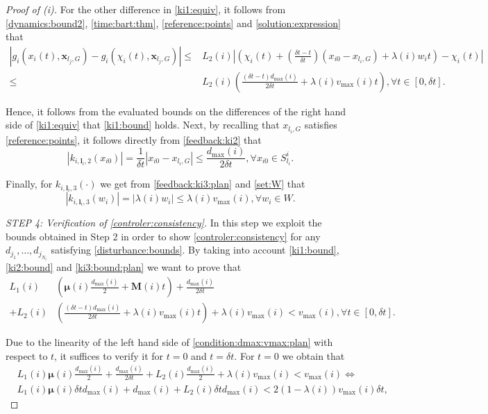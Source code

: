 \documentclass[reqno]{amsart}
\theoremstyle{plain}
\theoremstyle{definition}
\numberwithin{equation}{section}
\begin{document}
\begin{proof}[Proof of (i)]
\noindent For the other difference in \eqref{ki1:equiv}, it follows from \eqref{dynamics:bound2}, \eqref{time:bart:thm}, \eqref{reference:points} and \eqref{solution:expression} that
\begin{align*}
|g_i(x_i(t),{\textbf{{x}}}_{l_j,G})-g_i(\chi_i(t),{\textbf{{x}}}_{l_j,G})| \le & L_2(i)\left|\left(\chi_i(t)+\left(\frac{\delta t-t}{\delta t}\right)(x_{i0}-x_{l_i,G})+\lambda(i) w_it\right)-\chi_i(t)\right| \\
\le & L_{2}(i)\left(\frac{(\delta t-t)d_{\max}(i)}{2\delta t}+\lambda(i)v_{\max}(i)t\right), \forall t\in[0,\delta t].
\end{align*}

\noindent Hence, it follows from the evaluated bounds on the differences of the right hand side of \eqref{ki1:equiv} that \eqref{ki1:bound} holds. Next, by recalling that $x_{l_i,G}$ satisfies \eqref{reference:points}, it follows directly from \eqref{feedback:ki2} that
\begin{equation} \label{ki2:bound}
|k_{i,{\textbf{{l}}}_i,2}(x_{i0})|=\frac{1}{\delta t}|x_{i0}-x_{l_i,G}|\le \frac{d_{\max}(i)}{2\delta t},\forall x_{i0}\in S_{l_i}^i.
\end{equation}

\noindent Finally, for $k_{i,{\textbf{{l}}}_i,3}(\cdot)$ we get from \eqref{feedback:ki3:plan} and \eqref{set:W} that
\begin{equation} \label{ki3:bound:plan}
|k_{i,{\textbf{{l}}}_i,3}(w_i)| = |\lambda(i) w_i|\le \lambda(i) v_{\max}(i),\forall w_i\in W.
\end{equation}

\noindent \textit{STEP 4: Verification of \eqref{controler:consistency}.} In this step we exploit the bounds obtained in Step 2 in order to show \eqref{controler:consistency} for any $d_{j_1},\ldots,d_{j_{N_i}}$ satisfying \eqref{disturbance:bounds}. By taking into account \eqref{ki1:bound}, \eqref{ki2:bound} and \eqref{ki3:bound:plan} we want to prove that
\begin{align}
 L_{1}(i) & \left({\ensuremath{\boldsymbol{{\mu}}}}(i)\frac{d_{\max}(i)}{2}+{\textbf{{M}}}(i)t\right)+\frac{d_{\max}(i)}{2\delta t} \nonumber \\
 +L_{2}(i) &\left(\frac{(\delta t-t)d_{\max}(i)}{2\delta t}+\lambda(i)v_{\max}(i)t\right)+\lambda(i) v_{\max}(i)< v_{\max}(i), \forall t\in[0,\delta t].  \label{condition:dmax:vmax:plan}
\end{align}

\noindent Due to the linearity of the left hand side of \eqref{condition:dmax:vmax:plan} with respect to $t$, it suffices to verify it for $t=0$ and $t=\delta t$. For $t=0$ we obtain that
\begin{align*}
& L_{1}(i){\ensuremath{\boldsymbol{{\mu}}}}(i)\frac{d_{\max}(i)}{2}+\frac{d_{\max}(i)}{2\delta t}+L_{2}(i)\frac{d_{\max}(i)}{2}+\lambda(i) v_{\max}(i)< v_{\max}(i) \iff \\
& L_{1}(i){\ensuremath{\boldsymbol{{\mu}}}}(i)\delta t d_{\max}(i)+d_{\max}(i)+L_{2}(i)\delta td_{\max}(i)< 2(1-\lambda(i))v_{\max}(i)\delta t,
\end{align*}


\end{proof}
\end{document}

